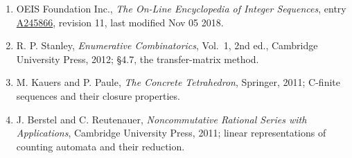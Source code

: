 \documentclass[11pt]{article}
\theoremstyle{definition}
\begin{document}
\begin{enumerate}

\item OEIS Foundation Inc., \emph{The On-Line Encyclopedia of Integer Sequences}, entry \href{https://oeis.org/A245866}{A245866}, revision 11, last modified Nov 05 2018.

\item R. P. Stanley, \emph{Enumerative Combinatorics}, Vol.~1, 2nd ed., Cambridge University Press, 2012; \S4.7, the transfer-matrix method.

\item M. Kauers and P. Paule, \emph{The Concrete Tetrahedron}, Springer, 2011; C-finite sequences and their closure properties.

\item J. Berstel and C. Reutenauer, \emph{Noncommutative Rational Series with Applications}, Cambridge University Press, 2011; linear representations of counting automata and their reduction.

\end{enumerate}
\end{document}
